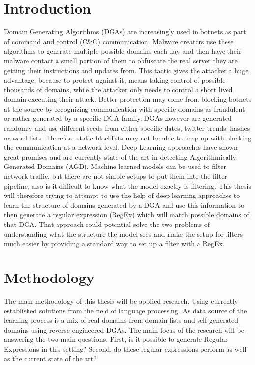 \documentclass[a4paper, 12pt]{article}
\begin{document}
\section{Introduction}
Domain Generating Algorithms (DGAs) are increasingly used in botnets as part of
command and control (C\&C) communication. Malware creators use these algorithms
to generate multiple possible domains each day and then have their malware
contact a small portion of them to obfuscate the real server they are getting
their instructions and updates from. This tactic gives the attacker a huge
advantage, because to protect against it, means taking control of possible thousands
of domains, while the attacker only needs to control a short lived domain
executing their attack. Better protection may come from blocking
botnets at the source by recognizing communication with specific domains as
fraudulent or rather generated by a specific DGA family. DGAs however are
generated randomly and use different seeds from either specific dates, twitter
trends, hashes or word lists. Therefore static blocklists may not be able to
keep up with blocking the communication at a network level. Deep Learning
approaches have shown great promises and are currently state of the art in
detecting Algorithmically-Generated Domains (AGD). 
Machine learned models can be used to filter network traffic, but there are not simple setups to put
them into the filter pipeline, also is it difficult to know what the model exactly is filtering.
This thesis will therefore trying to attempt to use the help of deep learning approaches  to learn the structure
of domains generated by a DGA and use this information to then generate a regular expression (RegEx) 
which will match possible domains of that DGA. That approach could potential solve the two problems
of understanding what the structure the model sees and make the setup for filters much easier by
providing a standard way to set up a filter with a RegEx.


\section{Methodology}
The main methodology of this thesis will be applied research. Using currently established solutions
from the field of language processing. As data source of the learning process is a mix of real
domains \cite{noauthor_cisco_nodate} from domain lists and self-generated domains using reverse
engineered DGAs. \cite{bader_baderjdomain_generation_algorithms_2024} The main focus of the research
will be answering the two main questions. First, is it possible to generate Regular Expressions in
this setting? Second, do these regular expressions perform as well as the current state of the art?
\end{document}
